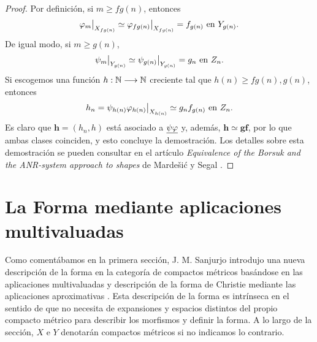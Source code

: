 \begin{proof}
  Por definición, si $ m\geq fg(n) $, entonces 
  \begin{gather*}
    \rest{\vf_m }{X_{fg(n)}} \simeq \rest{\vf_{fg(n)}}{X_{fg(n )}}  = f_{g(n)} \text{ en } Y_{g(n )}.
  \end{gather*}
  De igual modo, si $ m\geq g(n)  $,
  \begin{gather*}
    \rest{\psi_m}{Y_{g(n )}} \simeq \rest{\psi_{g(n) }}{Y_{g(n)}}  =g_n \text{ en } Z_n .
  \end{gather*}
  Si escogemos una función $ h:\mathbb{N} \longrightarrow \mathbb{N}  $ creciente tal que $ h(n)\geq fg(n),g(n) $, entonces 
  \begin{gather*}
    h_n = \rest{\psi_{h(n)}\vf_{h(n)}}{X_{h(n)}} \simeq g_n f_{g(n)} \text{ en } Z_n.
  \end{gather*}
  Es claro que $ \mathbf{h}= (h_n, h)$ está asociado a $\underline{\psi}\underline{\varphi } $ y, además, $ \mathbf{h }\simeq \mathbf{g}\mathbf{f} $, por lo que ambas clases coinciden, y esto concluye la demostración. Los detalles sobre esta demostración se pueden consultar en el artículo \textit{Equivalence of the Borsuk and the ANR-system approach to shapes} de Marde\v si\'c y Segal \cite{mardevsic1971equivalence}.
\end{proof}


\section{La Forma mediante aplicaciones multivaluadas}
Como comentábamos en la primera sección, J. M. Sanjurjo  \cite{sanjurjo_1990,sanjurjo_1992} introdujo una nueva descripción de la forma en la categoría de compactos métricos basándose en las aplicaciones multivaluadas y descripción de la forma de Christie mediante las aplicaciones aproximativas \cite{christie1944net}. Esta descripción de la forma es intrínseca en el sentido de que no necesita de expansiones y espacios distintos del propio compacto métrico para describir los morfismos y definir la forma. A lo largo de la sección, $ X $ e $ Y  $ denotarán compactos métricos si no indicamos lo contrario.

